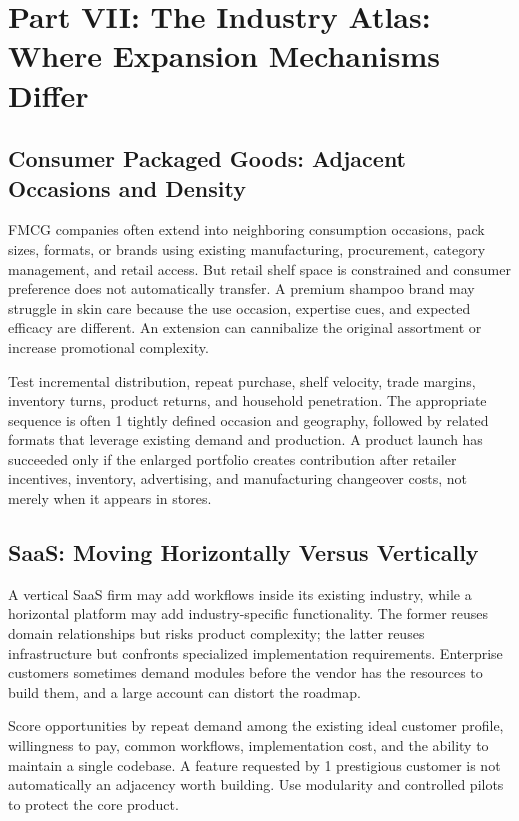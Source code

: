 \section*{Part VII: The Industry Atlas: Where Expansion Mechanisms Differ}
\label{sec:part7_industry_atlas_expansion_mechanisms}

\subsection{Consumer Packaged Goods: Adjacent Occasions and Density}
\label{sec:cpg_adjacent_occasions_density}

FMCG companies often extend into neighboring consumption occasions, pack sizes, formats, or brands using existing manufacturing, procurement, category management, and retail access. But retail shelf space is constrained and consumer preference does not automatically transfer. A premium shampoo brand may struggle in skin care because the use occasion, expertise cues, and expected efficacy are different. An extension can cannibalize the original assortment or increase promotional complexity.

Test incremental distribution, repeat purchase, shelf velocity, trade margins, inventory turns, product returns, and household penetration. The appropriate sequence is often 1 tightly defined occasion and geography, followed by related formats that leverage existing demand and production. A product launch has succeeded only if the enlarged portfolio creates contribution after retailer incentives, inventory, advertising, and manufacturing changeover costs, not merely when it appears in stores.

\subsection{SaaS: Moving Horizontally Versus Vertically}
\label{sec:saas_horizontal_vs_vertical}

A vertical SaaS firm may add workflows inside its existing industry, while a horizontal platform may add industry-specific functionality. The former reuses domain relationships but risks product complexity; the latter reuses infrastructure but confronts specialized implementation requirements. Enterprise customers sometimes demand modules before the vendor has the resources to build them, and a large account can distort the roadmap.

Score opportunities by repeat demand among the existing ideal customer profile, willingness to pay, common workflows, implementation cost, and the ability to maintain a single codebase. A feature requested by 1 prestigious customer is not automatically an adjacency worth building. Use modularity and controlled pilots to protect the core product.

